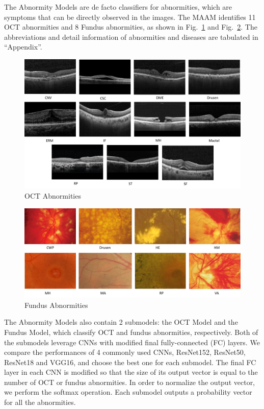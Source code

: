 \documentclass{article}
\begin{document}
	The Abnormity Models are de facto classifiers for abnormities, which are symptoms that can be directly observed in the images. The MAAM identifies 11 OCT abnormities and 8 Fundus abnormities, as shown in Fig.~\ref{fig:OCT_abnormities} and Fig.~\ref{fig:fundus_abnormities}. The abbreviations and detail information of abnormities and diseases are tabulated in ``Appendix''.
	
	\begin{figure}[htbp]
		\centering
		\includegraphics[width=\linewidth]{Figs/OCT_Abnormities.pdf}
		\caption{OCT Abnormities}
		\vspace{0.3cm}
		\label{fig:OCT_abnormities}
	\end{figure}
	
	\begin{figure}[htbp]
		\centering
		\includegraphics[width=\linewidth]{Figs/fundus_Abnormities.pdf}
		\caption{Fundus Abnormities}
		\vspace{0.3cm}
		\label{fig:fundus_abnormities}
	\end{figure}
	
	The Abnormity Models also contain 2 submodels: the OCT Model and the Fundus Model, which classify OCT and fundus abnormities, respectively. Both of the submodels leverage CNNs with modified final fully-connected (FC) layers. We compare the performances of 4 commonly used CNNs, ResNet152, ResNet50, ResNet18\autocite{He_Zhang_Ren_Sun_2016} and VGG16\autocite{Simonyan_Zisserman_2015}, and choose the best one for each submodel. The final FC layer in each CNN is modified so that the size of its output vector is equal to the number of OCT or fundus abnormities. In order to normalize the output vector, we perform the softmax operation. Each submodel outputs a probability vector for all the abnormities.
	
\end{document}
